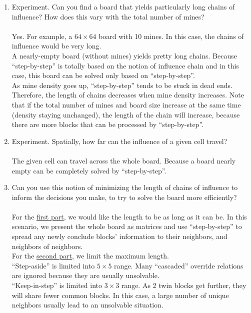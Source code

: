 \documentclass[letter]{article}
\begin{document}
\begin{enumerate}
	\item {Experiment. Can you find a board that yields particularly long chains of influence? How does this vary with the total number of mines?} \\
	\\
	Yes. For example, a $ 64 \times 64 $ board with 10 mines. In this case, the chains of influence would be very long. 
	\\
	A nearly-empty board (without mines) yields pretty long chains. Because ``step-by-step'' is totally based on the notion of influence chain and in this case, this board can be solved only based on ``step-by-step''. 
	\\
	As mine density goes up, ``step-by-step'' tends to be stuck in dead ends. Therefore, the length of chains decreases when mine density increases. Note that if the total number of mines and board size increase at the same time (density staying unchanged), the length of the chain will increase, because there are more blocks that can be processed by ``step-by-step''.
	\\
	\item {Experiment. Spatially, how far can the influence of a given cell travel?} \\
	\\
	The given cell can travel across the whole board. Because a board nearly empty can be completely solved by ``step-by-step''.
	\\
	\item {Can you use this notion of minimizing the length of chains of influence to inform the decisions you make, to try to solve the board more efficiently?} \\
	\\
	For the \hyperref[firstpart]{first part}, we would like the length to be as long as it can be. In this scenario, we present the whole board as matrices and use ``step-by-step'' to spread any newly conclude blocks’ information to their neighbors, and neighbors of neighbors.
	\\
	For the \hyperref[secondpart]{second part}, we limit the maximum length. \\
	``Step-aside'' is limited into $ 5 \times 5 $ range. Many ``cascaded'' override relations are ignored because they are usually unsolvable. \\
	``Keep-in-step'' is limited into $ 3 \times 3 $ range. As 2 twin blocks get further, they will share fewer common blocks. In this case, a large number of unique neighbors usually lead to an unsolvable situation. \\

\end{enumerate}
\end{document}
